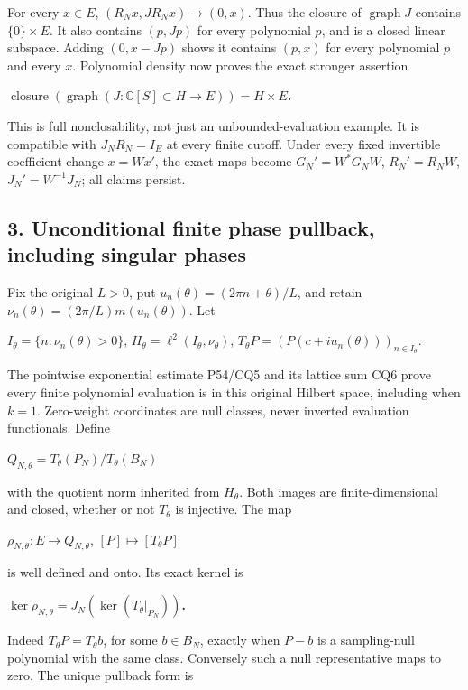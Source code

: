\documentclass{article}
\begin{document}
For every \(x\in E\), \((R_Nx,JR_Nx)\longrightarrow(0,x)\). Thus the closure of \(\operatorname{graph}J\) contains \(\{0\}\times E\). It also contains \((p,Jp)\) for every polynomial \(p\), and is a closed linear subspace. Adding \((0,x-Jp)\) shows it contains \((p,x)\) for every polynomial \(p\) and every \(x\). Polynomial density now proves the exact stronger assertion

\textbf{\(\operatorname{closure}(\operatorname{graph}(J:\mathbb C[S]\subset H\longrightarrow E))=H\times E\).}

This is full nonclosability, not just an unbounded-evaluation example. It is compatible with \(J_NR_N=I_E\) at every finite cutoff. Under every fixed invertible coefficient change \(x=Wx'\), the exact maps become \(G_N'=W^*G_NW\), \(R_N'=R_NW\), \(J_N'=W^{-1}J_N\); all claims persist.

\subsection{3. Unconditional finite phase pullback, including singular phases}\label{unconditional-finite-phase-pullback-including-singular-phases}

Fix the original \(L>0\), put \(u_n(\theta)=(2\pi n+\theta)/L\), and retain \(\nu_n(\theta)=(2\pi/L)m(u_n(\theta))\). Let

\(I_\theta=\{n:\nu_n(\theta)>0\}\), \(H_\theta=\ell^2(I_\theta,\nu_\theta)\), \(T_\theta P=(P(c+iu_n(\theta)))_{n\in I_\theta}\).

The pointwise exponential estimate P54/CQ5 and its lattice sum CQ6 prove every finite polynomial evaluation is in this original Hilbert space, including when \(k=1\). Zero-weight coordinates are null classes, never inverted evaluation functionals. Define

\(Q_{N,\theta}=T_\theta(P_N)/T_\theta(B_N)\)

with the quotient norm inherited from \(H_\theta\). Both images are finite-dimensional and closed, whether or not \(T_\theta\) is injective. The map

\(\rho_{N,\theta}:E\longrightarrow Q_{N,\theta}\), \([P]\longmapsto[T_\theta P]\)

is well defined and onto. Its exact kernel is

\textbf{\(\ker\rho_{N,\theta}=J_N(\ker(T_\theta|_{P_N}))\).}

Indeed \(T_\theta P=T_\theta b\), for some \(b\in B_N\), exactly when \(P-b\) is a sampling-null polynomial with the same class. Conversely such a null representative maps to zero. The unique pullback form is
\end{document}
